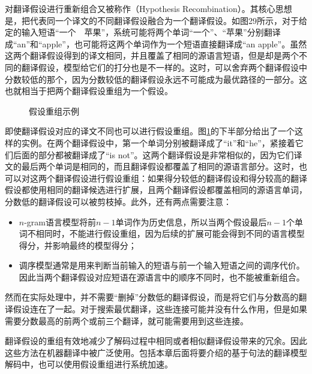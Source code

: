 \parinterval 对翻译假设进行重新组合又被称作{\small{}}（Hypothesis Recombination）。其核心思想是，把代表同一个译文的不同翻译假设融合为一个翻译假设。如图29所示，对于给定的输入短语``一个\ \ 苹果''，系统可能将两个单词``一个''、``苹果''分别翻译成``an''和``apple''，也可能将这两个单词作为一个短语直接翻译成``an apple''。虽然这两个翻译假设得到的译文相同，并且覆盖了相同的源语言短语，但是却是两个不同的翻译假设，模型给它们的打分也是不一样的。这时，可以舍弃两个翻译假设中分数较低的那个，因为分数较低的翻译假设永远不可能成为最优路径的一部分。这也就相当于把两个翻译假设重组为一个假设。

\begin{figure}[htp]
\centering

\caption{假设重组示例}
\label{fig:4-29}
\end{figure}

\parinterval 即使翻译假设对应的译文不同也可以进行假设重组。图\ref{fig:4-29}的下半部分给出了一个这样的实例。在两个翻译假设中，第一个单词分别被翻译成了``it''和``he''，紧接着它们后面的部分都被翻译成了``is not''。这两个翻译假设是非常相似的，因为它们译文的最后两个单词是相同的，而且翻译假设都覆盖了相同的源语言部分。这时，也可以对这两个翻译假设进行假设重组：如果得分较低的翻译假设和得分较高的翻译假设都使用相同的翻译候选进行扩展，且两个翻译假设都覆盖相同的源语言单词，分数低的翻译假设可以被剪枝掉。此外，还有两点需要注意：

\begin{itemize}
\vspace{0.5em}
\item $n$-gram语言模型将前$n-1$单词作为历史信息，所以当两个假设最后$n-1$个单词不相同时，不能进行假设重组，因为后续的扩展可能会得到不同的语言模型得分，并影响最终的模型得分；
\vspace{0.5em}
\item 调序模型通常是用来判断当前输入的短语与前一个输入短语之间的调序代价。因此当两个翻译假设对应短语在源语言中的顺序不同时，也不能被重新组合。
\vspace{0.5em}
\end{itemize}

\parinterval 然而在实际处理中，并不需要``删掉''分数低的翻译假设，而是将它们与分数高的翻译假设连在了一起。对于搜索最优翻译，这些连接可能并没有什么作用，但是如果需要分数最高的前两个或前三个翻译，就可能需要用到这些连接。

\parinterval 翻译假设的重组有效地减少了解码过程中相同或者相似翻译假设带来的冗余。因此这些方法在机器翻译中被广泛使用。包括本章后面将要介绍的基于句法的翻译模型解码中，也可以使用假设重组进行系统加速。

